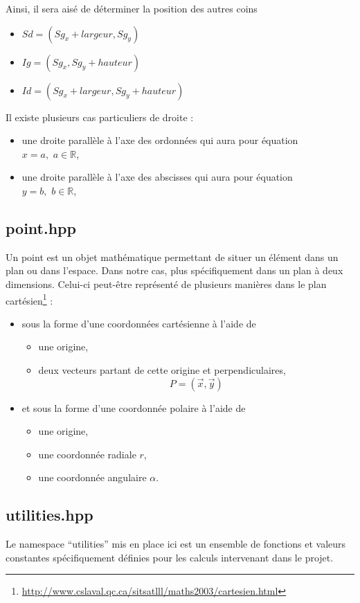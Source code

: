 \documentclass[a4paper,11pt]{report}
\begin{document}
Ainsi, il sera aisé de déterminer la position des autres coins 
\begin{itemize}
	\item $Sd = (Sg_x + largeur, Sg_y)$
	\item $Ig = (Sg_x , Sg_y + hauteur)$
	\item $Id = (Sg_x + largeur, Sg_y + hauteur)$
\end{itemize}

Il existe plusieurs cas particuliers de droite :
\begin{itemize}
	\item une droite parallèle à l'axe des ordonnées qui aura pour équation \\
		$x = a,$ $a \in \mathbb{R}$,
	\item une droite parallèle à l'axe des abscisses qui aura pour équation \\
		$y = b,$ $b \in \mathbb{R}$,
\end{itemize}
\subsection[Point]{point.hpp}
Un point est un objet mathématique permettant de situer un élément dans un plan
ou dans l'espace. Dans notre cas, plus spécifiquement dans un plan à deux
dimensions. Celui-ci peut-être représenté de plusieurs manières dans le plan 
cartésien\footnote{\url{http://www.cslaval.qc.ca/sitsatlll/maths2003/cartesien.html}} : 
\begin{itemize}
	\item sous la forme d'une coordonnées cartésienne à l'aide de 
		\begin{itemize}
			\item une origine,
			\item deux vecteurs partant de cette origine et perpendiculaires,
				$$P = (\vec{x}, \vec{y})$$
		\end{itemize}
	\item et sous la forme d'une coordonnée polaire à l'aide de
		\begin{itemize}
			\item une origine,
			\item une coordonnée radiale $r$,
			\item une coordonnée angulaire $\alpha$.
		\end{itemize}
\end{itemize}
\subsection[Utilitaire]{utilities.hpp}
Le namespace ``utilities'' mis en place ici est un ensemble de fonctions et valeurs
constantes spécifiquement définies pour les calculs intervenant dans le projet.
\end{document}
